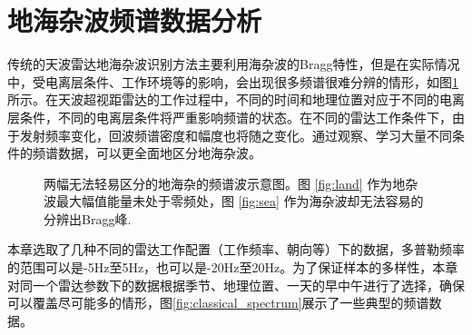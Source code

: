 \section{地海杂波频谱数据分析}
\label{sec:othr_data}
传统的天波雷达地海杂波识别方法主要利用海杂波的Bragg特性，但是在实际情况中，受电离层条件、工作环境等的影响，会出现很多频谱很难分辨的情形，如图\ref{fig:spectrum}所示。在天波超视距雷达的工作过程中，不同的时间和地理位置对应于不同的电离层条件，不同的电离层条件将严重影响频谱的状态。在不同的雷达工作条件下，由于发射频率变化，回波频谱密度和幅度也将随之变化。通过观察、学习大量不同条件的频谱数据，可以更全面地区分地海杂波。
\begin{figure}[H]
	\centering
	\hfil
	\caption{两幅无法轻易区分的地海杂的频谱波示意图。图 \ref{fig:land} 作为地杂波最大幅值能量未处于零频处，图 \ref{fig:sea} 作为海杂波却无法容易的分辨出Bragg峰.}
	\label{fig:spectrum}
\end{figure}
本章选取了几种不同的雷达工作配置（工作频率、朝向等）下的数据，多普勒频率的范围可以是-5Hz至5Hz，也可以是-20Hz至20Hz。为了保证样本的多样性，本章对同一个雷达参数下的数据根据季节、地理位置、一天的早中午进行了选择，确保可以覆盖尽可能多的情形，图\ref{fig:classical_spectrum}展示了一些典型的频谱数据。
